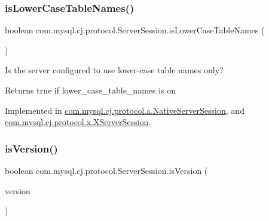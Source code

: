 \mbox{\label{interfacecom_1_1mysql_1_1cj_1_1protocol_1_1_server_session_a48d31222ed61fa5971aae698a5ff9fdf}} 
\subsubsection{\texorpdfstring{is\+Lower\+Case\+Table\+Names()}{isLowerCaseTableNames()}}
{\footnotesize\ttfamily boolean com.\+mysql.\+cj.\+protocol.\+Server\+Session.\+is\+Lower\+Case\+Table\+Names (\begin{DoxyParamCaption}{ }\end{DoxyParamCaption})}

Is the server configured to use lower-\/case table names only?

\begin{DoxyReturn}{Returns}
true if lower\+\_\+case\+\_\+table\+\_\+names is \textquotesingle{}on\textquotesingle{} 
\end{DoxyReturn}


Implemented in \mbox{\hyperlink{classcom_1_1mysql_1_1cj_1_1protocol_1_1a_1_1_native_server_session_a4409c3413cfab0fe0ce91af5d4c05454}{com.\+mysql.\+cj.\+protocol.\+a.\+Native\+Server\+Session}}, and \mbox{\hyperlink{classcom_1_1mysql_1_1cj_1_1protocol_1_1x_1_1_x_server_session_a835d6363081496694ef7760c4fe555c8}{com.\+mysql.\+cj.\+protocol.\+x.\+X\+Server\+Session}}.

\mbox{\label{interfacecom_1_1mysql_1_1cj_1_1protocol_1_1_server_session_a021c8f114fce23443b9a8b26074b137a}} 
\subsubsection{\texorpdfstring{is\+Version()}{isVersion()}}
{\footnotesize\ttfamily boolean com.\+mysql.\+cj.\+protocol.\+Server\+Session.\+is\+Version (\begin{DoxyParamCaption}\item[{\mbox{\hyperlink{classcom_1_1mysql_1_1cj_1_1_server_version}{Server\+Version}}}]{version }\end{DoxyParamCaption})}

